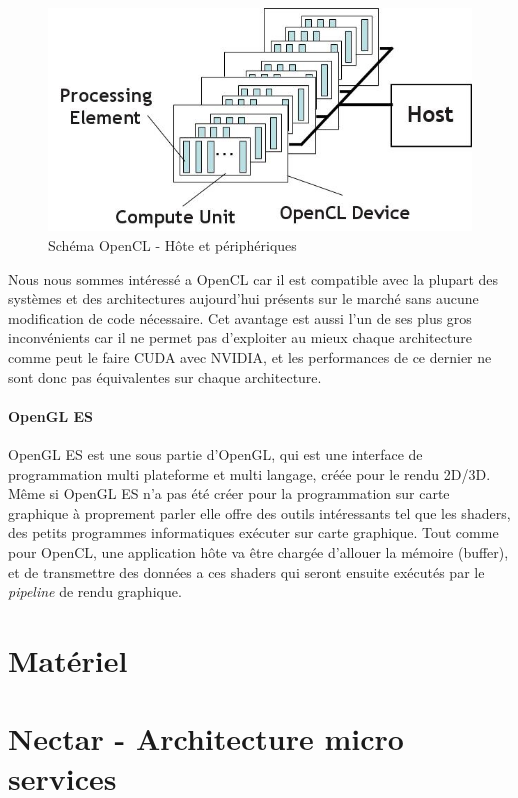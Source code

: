 \begin{figure}[H]
\centering
\includegraphics[width=0.5\linewidth]{images/opencl}
\caption{Schéma OpenCL - Hôte et périphériques\protect\footnotemark}
\label{fig:opencl}
\end{figure}


Nous nous sommes intéressé a OpenCL car il est compatible avec la plupart des systèmes et des architectures aujourd'hui présents sur le marché sans aucune modification de code nécessaire. Cet avantage est aussi l'un de ses plus gros inconvénients car il ne permet pas d'exploiter au mieux chaque architecture comme peut le faire CUDA avec NVIDIA, et les performances de ce dernier ne sont donc pas équivalentes sur chaque architecture. %

\paragraph{OpenGL ES} OpenGL ES est une sous partie d'OpenGL, qui est une interface de programmation multi plateforme et multi langage, créée pour le rendu 2D/3D. Même si OpenGL ES n'a pas été créer pour la programmation sur carte graphique à proprement parler elle offre des outils intéressants tel que les shaders, des petits programmes informatiques exécuter sur carte graphique. Tout comme pour OpenCL, une application hôte va être chargée d'allouer la mémoire (buffer), et de transmettre des données a ces shaders qui seront ensuite exécutés par le \emph{pipeline} de rendu graphique.




\section{Matériel}

\section{Nectar - Architecture micro services}
